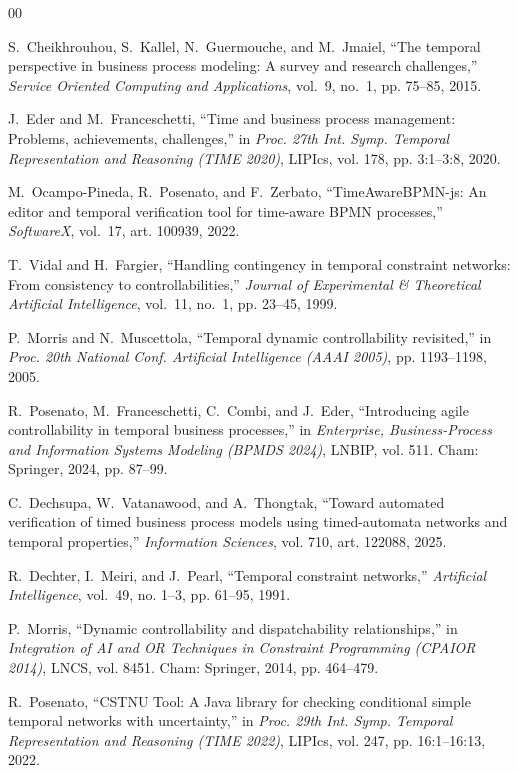\documentclass[conference]{IEEEtran}
\begin{document}
\begin{thebibliography}{00}

S.~Cheikhrouhou, S.~Kallel, N.~Guermouche, and M.~Jmaiel, ``The temporal perspective in business process modeling: A survey and research challenges,'' \emph{Service Oriented Computing and Applications}, vol.~9, no.~1, pp. 75--85, 2015.

J.~Eder and M.~Franceschetti, ``Time and business process management: Problems, achievements, challenges,'' in \emph{Proc. 27th Int. Symp. Temporal Representation and Reasoning (TIME 2020)}, LIPIcs, vol. 178, pp. 3:1--3:8, 2020.

M.~Ocampo-Pineda, R.~Posenato, and F.~Zerbato, ``TimeAwareBPMN-js: An editor and temporal verification tool for time-aware BPMN processes,'' \emph{SoftwareX}, vol.~17, art. 100939, 2022.

T.~Vidal and H.~Fargier, ``Handling contingency in temporal constraint networks: From consistency to controllabilities,'' \emph{Journal of Experimental \& Theoretical Artificial Intelligence}, vol.~11, no.~1, pp. 23--45, 1999.

P.~Morris and N.~Muscettola, ``Temporal dynamic controllability revisited,'' in \emph{Proc. 20th National Conf. Artificial Intelligence (AAAI 2005)}, pp. 1193--1198, 2005.

R.~Posenato, M.~Franceschetti, C.~Combi, and J.~Eder, ``Introducing agile controllability in temporal business processes,'' in \emph{Enterprise, Business-Process and Information Systems Modeling (BPMDS 2024)}, LNBIP, vol. 511. Cham: Springer, 2024, pp. 87--99.

C.~Dechsupa, W.~Vatanawood, and A.~Thongtak, ``Toward automated verification of timed business process models using timed-automata networks and temporal properties,'' \emph{Information Sciences}, vol. 710, art. 122088, 2025.

R.~Dechter, I.~Meiri, and J.~Pearl, ``Temporal constraint networks,'' \emph{Artificial Intelligence}, vol.~49, no. 1--3, pp. 61--95, 1991.

P.~Morris, ``Dynamic controllability and dispatchability relationships,'' in \emph{Integration of AI and OR Techniques in Constraint Programming (CPAIOR 2014)}, LNCS, vol. 8451. Cham: Springer, 2014, pp. 464--479.

R.~Posenato, ``CSTNU Tool: A Java library for checking conditional simple temporal networks with uncertainty,'' in \emph{Proc. 29th Int. Symp. Temporal Representation and Reasoning (TIME 2022)}, LIPIcs, vol. 247, pp. 16:1--16:13, 2022.


\end{thebibliography}
\end{document}
